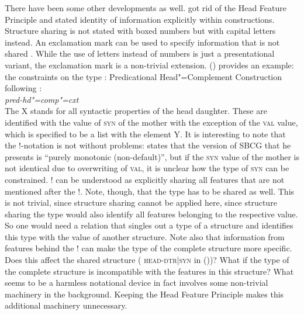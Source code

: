 \documentclass[output=paper,biblatex,babelshorthands,newtxmath,draftmode,colorlinks,citecolor=brown]{langscibook}
\begin{document}

There have been some other developments as well. \citet{Sag2012a} got rid of the Head Feature
Principle and stated identity of information explicitly within constructions. Structure sharing is
not stated with boxed numbers but with capital letters instead. An exclamation mark can be used to
specify information that is not shared \citep[]{Sag2012a}. While the use of letters instead
of numbers is just a presentational variant, the exclamation mark is a non-trivial
extension. () provides an example: the constraints on the type :
\eas
Predicational Head"=Complement Construction following \citet[]{Sag2012a}:\\
\emph{pred-hd"=comp"=cxt} \impl\\
\zs
The X stands for all syntactic properties of the head daughter. These are identified with the
value of \textsc{syn} of the mother with the exception of the \textsc{val} value, which is specified
to be a list with the element Y. It is interesting to note that the !-notation is not without
problems: \citet[]{Sag2012a} states that the version of SBCG that he presents is ``purely
monotonic (non-default)'', but if the \textsc{syn} value of the mother is not identical due to overwriting of \textsc{val}, it is unclear how the type of \textsc{syn} can be constrained. ! can be
understood as explicitly sharing all features that are not mentioned after the !. Note, though, that
the type has to be shared as well. This is not trivial, since structure sharing cannot be applied
here, since structure sharing the type would also identify all features belonging to the respective
value. So one would need a relation that singles out a type of a structure and identifies this type
with the value of another structure. Note also that information from features behind the ! can make
the type of the complete structure more specific. Does this affect the shared structure (\eg
\textsc{head-dtr|syn} in ())? What if the
type of the complete structure is incompatible with the features in this structure? What seems to be a harmless notational device in fact involves some
non-trivial machinery in the background. Keeping the Head Feature Principle makes this additional machinery
unnecessary.
\end{document}
